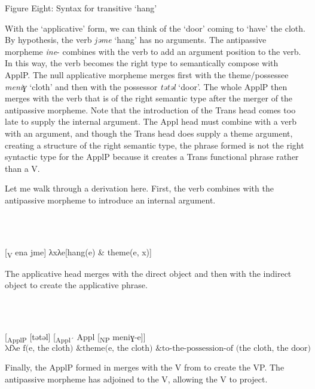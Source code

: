 \documentclass[output=paper,modfonts,nonflat]{langsci/langscibook}
\begin{document}
\begin{stylecaption}
Figure Eight: Syntax for transitive ‘hang’
\end{stylecaption}

With the ‘applicative’ form, we can think of the ‘door’ coming to ‘have’ the cloth.  By hypothesis, the verb \textit{jǝme} ‘hang’ has no arguments. The antipassive morpheme \textit{ine}{}- combines with the verb to add an argument position to the verb.  In this way, the verb becomes the right type to semantically compose with ApplP.  The null applicative morpheme merges first with the theme/possessee \textit{meniɣ} ‘cloth’ and then with the possessor \textit{tǝtǝl} ‘door’.  The whole ApplP then merges with the verb that is of the right semantic type after the merger of the antipassive morpheme. Note that the introduction of the Trans head comes too late to supply the internal argument. The Appl head must combine with a verb with an argument, and though the Trans head does supply a theme argument, creating a structure of the right semantic type, the phrase formed is not the right syntactic type for the ApplP because it creates a Trans functional phrase rather than a V.

Let me walk through a derivation here.  First, the verb combines with the antipassive morpheme to introduce an internal argument.

\ea%
    \label{ex:key:7}
    \gll\\
        \\
    \glt
    \z

          [\textsubscript{V} ena jme]    λxλe[hang(e) \& theme(e, x)]    

The applicative head merges with the direct object and then with the indirect object to create the applicative phrase.

\ea%
    \label{ex:key:8}
    \gll\\
        \\
    \glt
    \z

          [\textsubscript{ApplP} [tǝtǝl] [\textsubscript{Appl´} Appl [\textsubscript{NP} meniɣ-e]]   $\text{λfλe}\text{ f(e, the cloth) \&} \text{theme}\text{(e, the cloth) \& to-the-possession}\text{{}-of}\text{ (the cloth, the door)}$

Finally, the ApplP formed in  merges with the V from  to create the VP.  The antipassive morpheme has adjoined to the V, allowing the V to project.

\ea%
    \label{ex:key:9}
    \gll\\
        \\
    \glt
    \z
\end{document}
